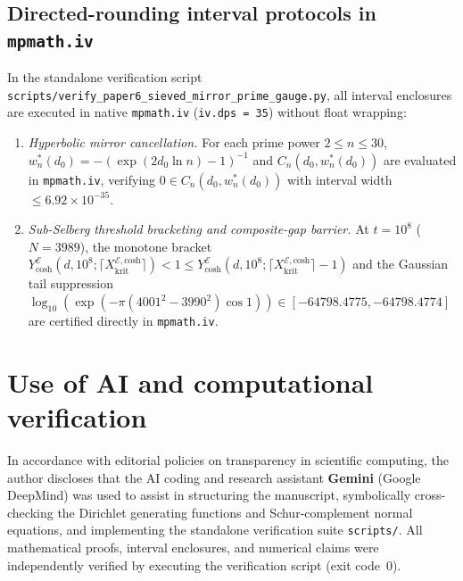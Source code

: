 \documentclass[11pt,reqno]{amsart}
\theoremstyle{definition}
\theoremstyle{remark}
\numberwithin{equation}{section}
\begin{document}
\subsection{Directed-rounding interval protocols in \texttt{mpmath.iv}}\label{app:interval}

In the standalone verification script \texttt{scripts/verify\_paper6\_sieved\_mirror\_prime\_gauge.py}, all interval enclosures are executed in native \texttt{mpmath.iv} (\texttt{iv.dps = 35}) without float wrapping:
\begin{enumerate}[label=\textup{(\arabic*)},leftmargin=2.2em]
\item \textit{Hyperbolic mirror cancellation.} For each prime power $2 \le n \le 30$, $w_n^*(d_0) = -(\exp(2d_0\ln n) - 1)^{-1}$ and $C_n(d_0, w_n^*(d_0))$ are evaluated in \texttt{mpmath.iv}, verifying $0 \in C_n(d_0, w_n^*(d_0))$ with interval width $\le 6.92 \times 10^{-35}$.
\item \textit{Sub-Selberg threshold bracketing and composite-gap barrier.} At $t = 10^8$ ($N = 3989$), the monotone bracket $Y_{\cosh}^{\mathcal{E}}(d, 10^8; \lceil X_{\mathrm{krit}}^{\mathcal{E},\mathrm{cosh}}\rceil) < 1 \le Y_{\cosh}^{\mathcal{E}}(d, 10^8; \lceil X_{\mathrm{krit}}^{\mathcal{E},\mathrm{cosh}}\rceil - 1)$ and the Gaussian tail suppression $\log_{10}(\exp(-\pi(4001^2 - 3990^2)\cos 1)) \in [-64798.4775, -64798.4774]$ are certified directly in \texttt{mpmath.iv}.
\end{enumerate}

\section*{Use of AI and computational verification}

{\sloppy
In accordance with editorial policies on transparency in scientific computing, the author discloses that the AI coding and research assistant \textbf{Gemini} (Google DeepMind) was used to assist in structuring the manuscript, symbolically cross-checking the Dirichlet generating functions and Schur-complement normal equations, and implementing the standalone verification suite \texttt{scripts/}\allowbreak\texttt{}. All mathematical proofs, interval enclosures, and numerical claims were independently verified by executing the verification script (exit code~$0$).\par}
\end{document}
